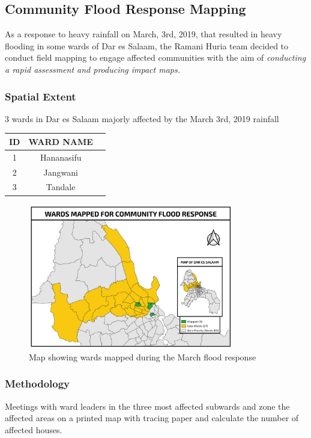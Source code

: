 \documentclass[a4paper,12pt,twoside]{article}
\begin{document}
\newpage
\subsection{Community Flood Response Mapping}
As a response to heavy rainfall on March, 3rd, 2019, that resulted in heavy flooding in some wards of Dar es Salaam, the Ramani Huria team decided to conduct field mapping to engage affected communities with the aim of \textit{conducting a rapid assessment and producing impact maps.}

\subsubsection{Spatial Extent}
3 wards in Dar es Salaam majorly affected by the March 3rd, 2019 rainfall

\begin{center}
\begin{tabular}{|c|c|c|}
\hline
ID & WARD NAME\\
\hline
1 & Hananasifu\\
\hline
2 & Jangwani\\
\hline
3 & Tandale\\
\hline
\end{tabular}
\end{center}

\begin{figure}[h]
  \color{RHgreen}\caption{Map showing wards mapped during the March flood response}
  \centering
 \includegraphics[width=0.8\textwidth]{images/flood_response.png}
\end{figure}

\subsubsection{Methodology}
Meetings with ward leaders in the three most affected subwards and zone the affected areas on a printed map with tracing paper and calculate the number of affected houses.
\end{document}
